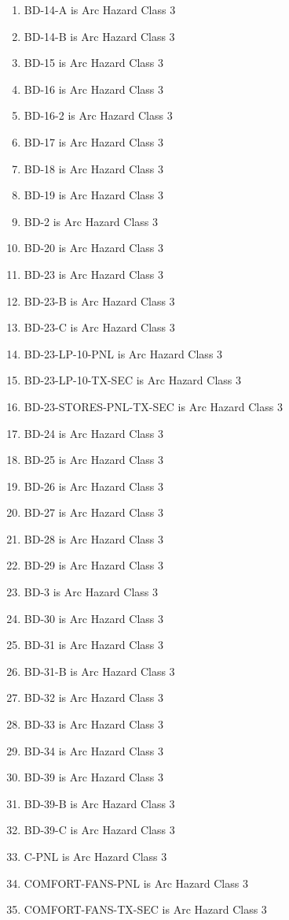 \begin{enumerate}
\item BD-14-A is Arc Hazard Class 3
\item BD-14-B is Arc Hazard Class 3
\item BD-15 is Arc Hazard Class 3
\item BD-16 is Arc Hazard Class 3
\item BD-16-2 is Arc Hazard Class 3
\item BD-17 is Arc Hazard Class 3
\item BD-18 is Arc Hazard Class 3
\item BD-19 is Arc Hazard Class 3
\item BD-2 is Arc Hazard Class 3
\item BD-20 is Arc Hazard Class 3
\item BD-23 is Arc Hazard Class 3
\item BD-23-B is Arc Hazard Class 3
\item BD-23-C is Arc Hazard Class 3
\item BD-23-LP-10-PNL is Arc Hazard Class 3
\item BD-23-LP-10-TX-SEC is Arc Hazard Class 3
\item BD-23-STORES-PNL-TX-SEC is Arc Hazard Class 3
\item BD-24 is Arc Hazard Class 3
\item BD-25 is Arc Hazard Class 3
\item BD-26 is Arc Hazard Class 3
\item BD-27 is Arc Hazard Class 3
\item BD-28 is Arc Hazard Class 3
\item BD-29 is Arc Hazard Class 3
\item BD-3 is Arc Hazard Class 3
\item BD-30 is Arc Hazard Class 3
\item BD-31 is Arc Hazard Class 3
\item BD-31-B is Arc Hazard Class 3
\item BD-32 is Arc Hazard Class 3
\item BD-33 is Arc Hazard Class 3
\item BD-34 is Arc Hazard Class 3
\item BD-39 is Arc Hazard Class 3
\item BD-39-B is Arc Hazard Class 3
\item BD-39-C is Arc Hazard Class 3
\item C-PNL is Arc Hazard Class 3
\item COMFORT-FANS-PNL is Arc Hazard Class 3
\item COMFORT-FANS-TX-SEC is Arc Hazard Class 3

\end{enumerate}
